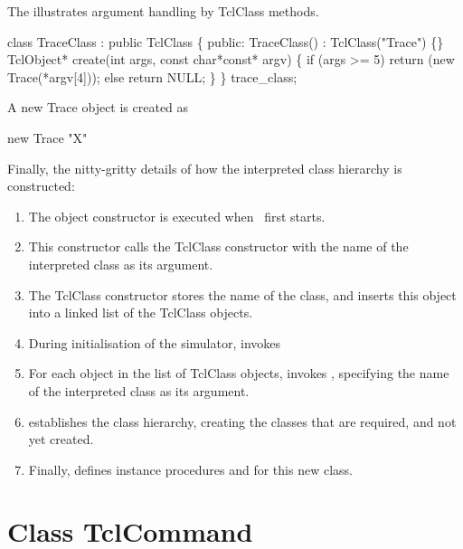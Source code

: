 The  illustrates
argument handling by TclClass methods.
\begin{program}
        class TraceClass : public TclClass \{
        public:
                TraceClass() : TclClass("Trace") \{\}
                TclObject* create(int args, const char*const* argv) \{
                        if (args >= 5)
                                return (new Trace(*argv[4]));
                        else
                                return NULL;
                \}
        \} trace_class;
\end{program}
A new Trace object is created as
\begin{program}
        new Trace "X"
\end{program}
Finally, the nitty-gritty details of how the 
interpreted class hierarchy is constructed:
\begin{enumerate}
\item The object constructor is executed when \ns\ first starts.
\item This constructor calls the TclClass constructor
  with the name of the interpreted class as its argument.
\item The TclClass constructor stores the name of the class,
  and inserts this object into a linked list of the TclClass objects.
\item During initialisation of the simulator,
  invokes 
\item For each object in the list of TclClass objects,
   invokes 
  ,
  specifying the name of the interpreted class as its argument.
\item {} establishes the class hierarchy,
  creating the classes that are required, and not yet created.
\item Finally,  defines instance procedures
   and  for this new class.
\end{enumerate}

\section{Class TclCommand}
\label{sec:TclCommand}


